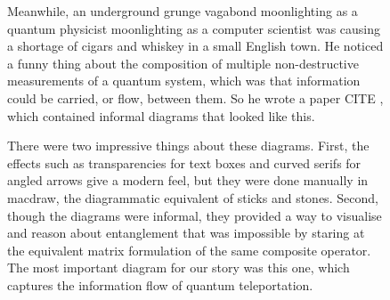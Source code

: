 \begin{figure}[h!]
\centering
{}
\caption{Meanwhile, an underground grunge vagabond moonlighting as a quantum physicist moonlighting as a computer scientist was causing a shortage of cigars and whiskey in a small English town. He noticed a funny thing about the composition of multiple non-destructive measurements of a quantum system, which was that information could be carried, or flow, between them. So he wrote a paper \bR CITE \e, which contained informal diagrams that looked like this.}
\end{figure}

\begin{figure}[h!]
\centering
{}
\caption{There were two impressive things about these diagrams. First, the effects such as transparencies for text boxes and curved serifs for angled arrows give a modern feel, but they were done manually in macdraw, the diagrammatic equivalent of sticks and stones. Second, though the diagrams were informal, they provided a way to visualise and reason about entanglement that was impossible by staring at the equivalent matrix formulation of the same composite operator. The most important diagram for our story was this one, which captures the information flow of quantum teleportation.}
\end{figure}
\clearpage

